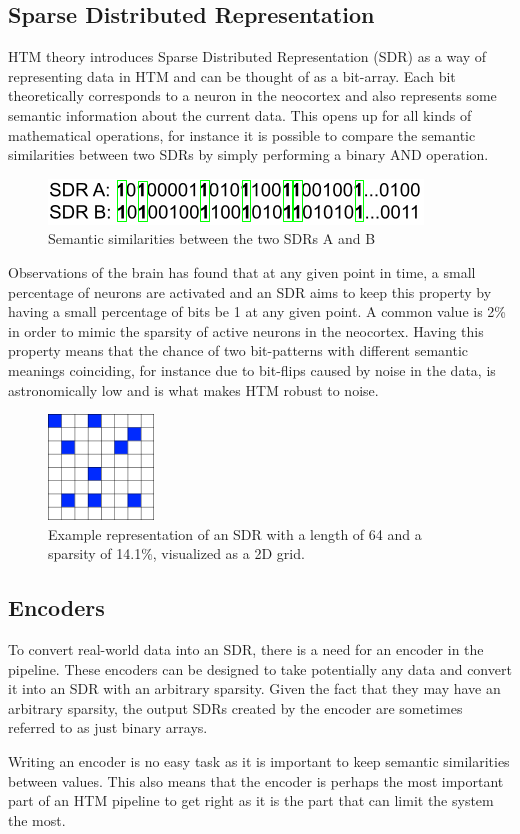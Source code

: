 \subsection{Sparse Distributed Representation}
HTM theory introduces Sparse Distributed Representation (SDR) as a way of representing data in HTM and can be thought of as a bit-array. Each bit theoretically corresponds to a neuron in the neocortex and also represents some semantic information about the current data. This opens up for all kinds of mathematical operations, for instance it is possible to compare the semantic similarities between two SDRs by simply performing a binary AND operation.
\begin{figure}[H]
    \centering
    \includegraphics{resources/related_works/sdr-semantics.png}
    \caption{Semantic similarities between the two SDRs A and B}
    \label{fig:sdr_semantics}
\end{figure}
Observations of the brain has found that at any given point in time, a small percentage of neurons are activated and an SDR aims to keep this property by having a small percentage of bits be 1 at any given point. A common value is 2\% in order to mimic the sparsity of active neurons in the neocortex. Having this property means that the chance of two bit-patterns with different semantic meanings coinciding, for instance due to bit-flips caused by noise in the data, is astronomically low and is what makes HTM robust to noise.
\begin{figure}[H]
    \centering
    \includegraphics[width=0.25\textwidth]{resources/related_works/SDR.png}
    \caption{Example representation of an SDR with a length of 64 and a sparsity of 14.1\%, visualized as a 2D grid.}
\end{figure}
\subsection{Encoders}
\label{sec:encoders}
To convert real-world data into an SDR, there is a need for an encoder in the pipeline. These encoders can be designed to take potentially any data and convert it into an SDR with an arbitrary sparsity. Given the fact that they may have an arbitrary sparsity, the output SDRs created by the encoder are sometimes referred to as just binary arrays.\par
Writing an encoder is no easy task as it is important to keep semantic similarities between values. This also means that the encoder is perhaps the most important part of an HTM pipeline to get right as it is the part that can limit the system the most.\par


